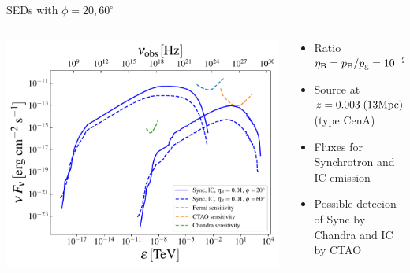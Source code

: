 \begin{frame}{SEDs with $\phi=20,60^{\circ}$}
	\begin{columns}
		\begin{column}{.6\textwidth}
			\includegraphics[width=\textwidth]{images/sed_hr.pdf}
		\end{column}
		\begin{column}{.4\textwidth}
			{\scriptsize
			\begin{itemize}
				\item Ratio $\eta_{\rm B}=p_{\rm B}/p_{\rm g}=10^{-2}$
				\item Source at $z=0.003\;(13{\rm Mpc})$ (type CenA)
				\item Fluxes for Synchrotron and IC emission
				\item Possible detecion of Sync by Chandra and IC by CTAO
			\end{itemize}
			}
		\end{column}
	\end{columns}
\end{frame}

